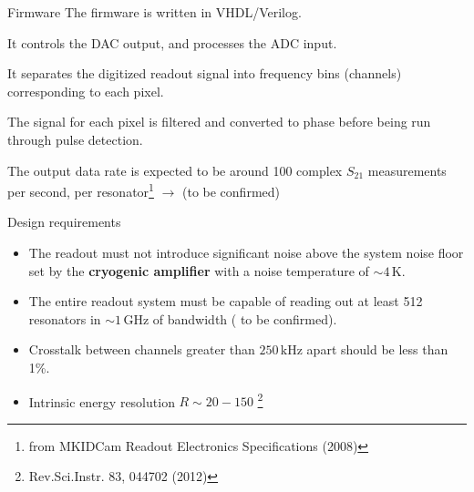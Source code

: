 \documentclass[ignorenonframetext,12pt]{beamer}
\begin{document}
\begin{frame}{Firmware}
        The firmware is written in VHDL/Verilog.

        It controls the DAC output, and processes the ADC input.

        It separates the digitized readout signal into frequency bins (channels)
        corresponding to each pixel.

        The signal for each pixel is filtered and converted to phase before
        being run through \alert{pulse detection}.

        The output data rate is expected to be around 100 complex $S_{21}$
        measurements per second, per resonator\footnote{\tiny{from
        MKIDCam Readout Electronics Specifications (2008)}} $\to$ (\alert{to be
        confirmed})
\end{frame}

\begin{frame}{Design requirements}
        \begin{itemize}
                \item The readout must not introduce significant noise above the
                        system noise floor set by the \textbf{cryogenic
                        amplifier} with a noise temperature of $\sim
                        4\,\text{K}$.
                \item The entire readout system must be capable of
                        reading out at least \alert{512 resonators} in $\sim
                        1\,\text{GHz}$ of bandwidth ({\color{red} to be
                        confirmed}).
                \item \alert{Crosstalk} between channels greater than
                        $250\,\text{kHz}$ apart should be less than \alert{1\%}.
                \item Intrinsic energy resolution \alert{$R \sim 20-150$}
                        \footnote{Rev.Sci.Instr. 83, 044702 (2012)}
        \end{itemize}
\end{frame}
\end{document}
